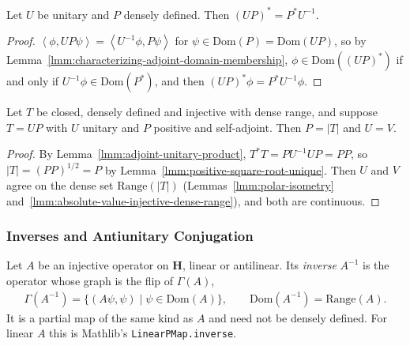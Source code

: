 \begin{lemma}
    \label{lmm:adjoint-unitary-product}
    \leanok
    Let $U$ be unitary and $P$ densely defined. Then $(UP)^* = P^*U^{-1}$.
\end{lemma}
\begin{proof}
    \leanok
    $\left< \phi, UP\psi \right> = \left< U^{-1}\phi, P\psi \right>$ for $\psi \in \text{Dom}(P) = \text{Dom}(UP)$, so by Lemma~\ref{lmm:characterizing-adjoint-domain-membership}, $\phi \in \text{Dom}((UP)^*)$ if and only if $U^{-1}\phi \in \text{Dom}(P^*)$, and then $(UP)^*\phi = P^*U^{-1}\phi$.
\end{proof}

\begin{theorem}
    \label{thrm:polar-decomposition-unique}
    \leanok
    Let $T$ be closed, densely defined and injective with dense range, and suppose $T = UP$ with $U$ unitary and $P$ positive and self-adjoint. Then $P = |T|$ and $U = V$.
\end{theorem}
\begin{proof}
    \leanok
    By Lemma~\ref{lmm:adjoint-unitary-product}, $T^*T = PU^{-1}UP = PP$, so $|T| = (PP)^{1/2} = P$ by Lemma~\ref{lmm:positive-square-root-unique}. Then $U$ and $V$ agree on the dense set $\text{Range}(|T|)$ (Lemmas~\ref{lmm:polar-isometry} and~\ref{lmm:absolute-value-injective-dense-range}), and both are continuous.
\end{proof}

\subsubsection{Inverses and Antiunitary Conjugation}

\begin{definition}
    \label{def:inverse-of-operator}
    \leanok
    Let $A$ be an injective operator on $\mathbf{H}$, linear or antilinear. Its \emph{inverse} $A^{-1}$ is the operator whose graph is the flip of $\Gamma(A)$,
    \begin{align}
        \Gamma(A^{-1}) = \{ (A\psi, \psi) \mid \psi \in \text{Dom}(A) \}, \qquad \text{Dom}(A^{-1}) = \text{Range}(A).
    \end{align}
    It is a partial map of the same kind as $A$ and need not be densely defined. For linear $A$ this is Mathlib's \texttt{LinearPMap.inverse}.
\end{definition}

